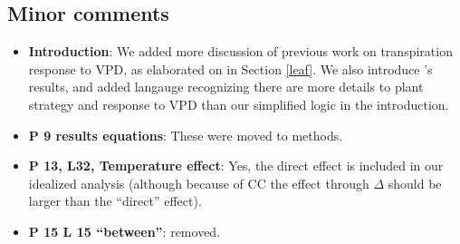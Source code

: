 \documentclass[12pt]{article}
\begin{document}
\subsection{Minor comments}

\begin{itemize}
  \item \textbf{Introduction}: We added more discussion of previous
    work on transpiration response to VPD, as elaborated on in Section
    \ref{leaf}. We also introduce \cite{Novick_2016}'s results, and
    added langauge recognizing there are more details to plant strategy
    and response to VPD than our simplified logic in the introduction.
  \item \textbf{P 9 results equations}: These were moved to methods.
  \item \textbf{P 13, L32, Temperature effect}: Yes, the direct effect is
    included in our idealized analysis (although because of CC the
    effect through $\Delta$ should be larger than the ``direct''
    effect).
  \item \textbf{P 15 L 15 ``between''}: removed.
\end{itemize}











\end{document}
